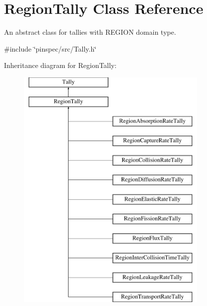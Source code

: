 \hypertarget{classRegionTally}{\section{Region\-Tally Class Reference}
\label{classRegionTally}
}


An abstract class for tallies with R\-E\-G\-I\-O\-N domain type.  




{\ttfamily \#include \char`\"{}pinspec/src/\-Tally.\-h\char`\"{}}

Inheritance diagram for Region\-Tally\-:\begin{figure}[H]
\begin{center}
\leavevmode
\includegraphics[height=12.000000cm]{classRegionTally}
\end{center}
\end{figure}
